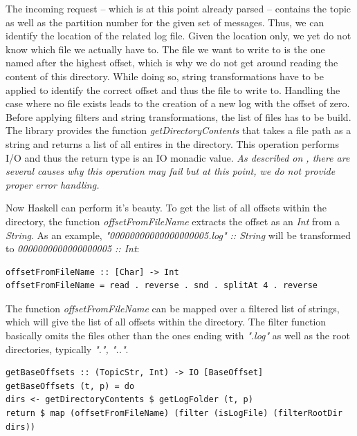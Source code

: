 The incoming request -- which is at this point already parsed -- contains the
topic as well as the partition number for the given set of messages. Thus, we
can identify the location of the related log file. Given the location only, we yet do
not know which file we actually have to.
The file we want to write to is the one named after the highest offset,
which is why we do not get around reading the content of this directory. While doing so,
string transformations have to be applied to identify the correct offset and thus the
file to write to. Handling the case where no file exists leads
to the creation of a new log with the offset of zero.
\\

Before applying filters and string transformations, the list of files has to be
build. The library
provides the function \textit{getDirectoryContents} that takes a file path as a
string and returns a list of all entires in the directory. This operation
performs I/O and thus the return type is an IO monadic value. \textit{As
described on
,
there are several causes why this operation may fail but at this point, we do
not provide proper error handling.}

Now Haskell can perform it's beauty. To get the list of all offsets within
the directory, the function \textit{offsetFromFileName} extracts the offset
as an \textit{Int} from a \textit{String}. As an example,
\textit{"00000000000000000005.log" :: String } will be transformed to
\textit{0000000000000000005 :: Int}:

\begin{lstlisting}
offsetFromFileName :: [Char] -> Int
offsetFromFileName = read . reverse . snd . splitAt 4 . reverse
\end{lstlisting}

The function \textit{offsetFromFileName} can be mapped over a filtered list of
strings, which will give the list of all offsets within the directory. The
filter function basically omits the files other than the ones ending with
\textit{".log"} as well as the root directories, typically \textit{".", ".."}.


\begin{lstlisting}
getBaseOffsets :: (TopicStr, Int) -> IO [BaseOffset]
getBaseOffsets (t, p) = do
dirs <- getDirectoryContents $ getLogFolder (t, p)
return $ map (offsetFromFileName) (filter (isLogFile) (filterRootDir dirs))
\end{lstlisting}

